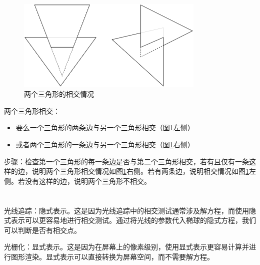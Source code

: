 \documentclass{article}
\begin{document}
\section{}

\begin{figure}
    \centering
    \includegraphics[width=0.8\textwidth]{pic/image-20231212174346327.png}
    \caption{两个三角形的相交情况}
    \label{fig:triangles}
\end{figure}

两个三角形相交：

\begin{itemize}[leftmargin=2cm]
    \item 要么一个三角形的两条边与另一个三角形相交（图\ref{fig:triangles}左侧）
    \item 或者两个三角形的一条边与另一个三角形相交（图\ref{fig:triangles}右侧）
\end{itemize}

步骤：检查第一个三角形的每一条边是否与第二个三角形相交，若有且仅有一条这样的边，说明两个三角形相交情况如图\ref{fig:triangles}右侧。若有两条边，说明相交情况如图\ref{fig:triangles}左侧。若没有这样的边，说明两个三角形不相交。

\section{}

\subsection{}

光线追踪：隐式表示。这是因为光线追踪中的相交测试通常涉及解方程，而使用隐式表示可以更容易地进行相交测试。通过将光线的参数代入椭球的隐式方程，我们可以判断是否有相交点。

光栅化：显式表示。这是因为在屏幕上的像素级别，使用显式表示更容易计算并进行图形渲染。显式表示可以直接转换为屏幕空间，而不需要解方程。

\subsection{}
\end{document}
